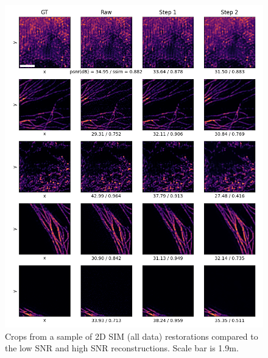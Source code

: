 \documentclass[12pt]{article}
\begin{document}
\begin{figure}[hbtp]
    \includegraphics[scale=0.8, center]{figures/m023_m024_reconstruction_samples.png}
    \caption{Crops from a sample of 2D SIM (all data) restorations compared to the low SNR and high SNR reconstructions.
    Scale bar is 1.9\textmu m.}
    \label{fig:2D_further_samples}
\end{figure}
\end{document}

